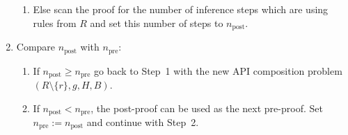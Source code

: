\begin{definition}
\begin{enumerate}
\begin{enumerate}
 \item Else scan the proof for the number of inference steps which are using rules from $R$ and set this number of steps to $n_{\text{post}}$.  
  \end{enumerate}
  \item Compare $n_{\text{post}}$ with $n_{\text{pre}}$:
 \begin{enumerate}
 \item If $n_{\text{post}} \geq n_{\text{pre}}$ %
	go back to Step~1 with the new API composition problem $(R\setminus \{ r\}, g, H, B)$. %
 \item If $n_{\text{post}} < n_{\text{pre}}$, the post-proof
 can be used as the next pre-proof.
       Set $n_{\text{pre}}:=n_{\text{post}}$ and continue with Step~2.
 \end{enumerate}
  
\end{enumerate}
\end{definition}

